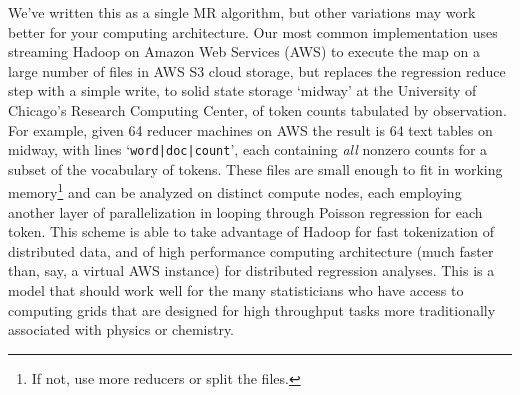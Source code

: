 \documentclass[12pt]{article}
\newcommand{\sgl}{\setstretch{1.1}}
\newcommand{\bs}[1]{\boldsymbol{#1}}
\newcommand{\bm}[1]{\mathbf{#1}}
\newcommand{\cd}[1]{{\tt#1}}
\begin{document}



We've written this as a single MR algorithm, but other variations may work better for your computing architecture. Our most common implementation uses streaming Hadoop on Amazon Web Services (AWS) to execute the map on a large number of files in AWS S3 cloud storage, but replaces the regression reduce step with a simple write, to solid state storage `midway' at the University of Chicago's Research Computing Center, of token counts tabulated by observation.  For example, given 64 reducer machines on AWS the result is 64 text tables on midway, with lines `\cd{word|doc|count}', each containing {\it all} nonzero counts for a subset of the vocabulary of tokens.  These files are small enough to fit in working memory\footnote{If not, use more reducers or split the files.} and can be analyzed on distinct compute nodes, each employing another layer of parallelization in looping through Poisson regression for each token.  This scheme is able to take advantage of Hadoop for fast tokenization of distributed data, and of
high performance computing architecture (much faster than, say, a virtual AWS instance) for distributed  regression analyses.  This is a model that should work well for the many statisticians who have access to computing grids that are designed for high throughput tasks more traditionally associated with physics or chemistry.

\sgl\small


\end{document}
